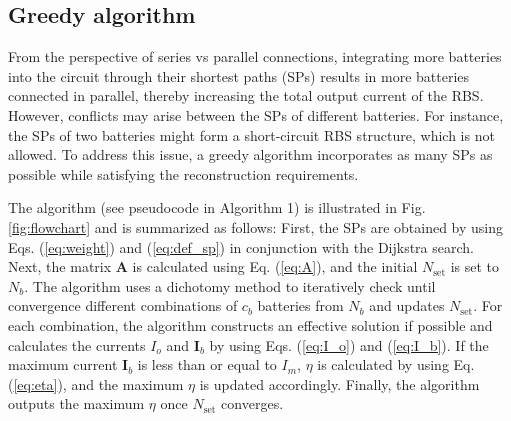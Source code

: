 \documentclass{article}
\begin{document}
\subsection{Greedy algorithm}\label{subsec:greedy_solution}

From the perspective of series vs parallel connections, integrating more batteries into the circuit through their shortest paths (SPs) results in more batteries connected in parallel, thereby increasing the total output current of the RBS.
However, conflicts may arise between the SPs of different batteries. 
For instance, the SPs of two batteries might form a short-circuit RBS structure, which is not allowed. 
To address this issue, a greedy algorithm incorporates as many SPs as possible while satisfying the reconstruction requirements.

The algorithm (see pseudocode in Algorithm 1) is illustrated in Fig. \ref{fig:flowchart} and is summarized as follows:
First, the SPs are obtained by using Eqs. (\ref{eq:weight}) and (\ref{eq:def_sp}) in conjunction with the Dijkstra search. 
Next, the matrix $\bm{A}$ is calculated using Eq. (\ref{eq:A}), and the initial $N_{\text{set}}$ is set to $N_b$. 
The algorithm uses a dichotomy method to iteratively check until convergence different combinations of $c_b$ batteries from $N_b$ and updates $N_{\text{set}}$. 
For each combination, the algorithm constructs an effective solution if possible and calculates the currents $I_o$ and $\bm{I}_b$ by using Eqs. (\ref{eq:I_o}) and (\ref{eq:I_b}). 
If the maximum current $\bm{I}_b$ is less than or equal to $I_m$, $\eta$ is calculated by using Eq. (\ref{eq:eta}), and the maximum $\eta$ is updated accordingly. 
Finally, the algorithm outputs the maximum $\eta$ once $N_{\text{set}}$ converges.
\end{document}

